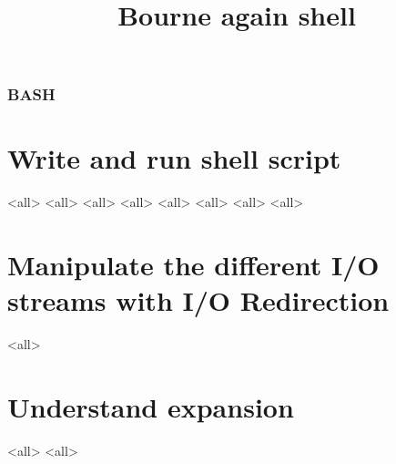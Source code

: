 
\title[bash]{Bourne again shell}




\begin{frame}
	\frametitle{BASH}
	\titlepage
	\vspace{-0.5cm}
	\begin{center}
	\end{center}
\end{frame}

\begin{frame}
	\tableofcontents
\end{frame}




\section{Write and run shell script}
\mode<all>{}
\mode<all>{}
\mode<all>{}
\mode<all>{}
\mode<all>{}
\mode<all>{}
\mode<all>{}
\mode<all>{}

\section{Manipulate the different I/O streams  with I/O Redirection}
\mode<all>{}

\section{Understand expansion}

\mode<all>{}
\mode<all>{}

